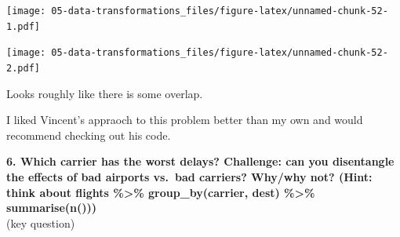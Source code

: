 \documentclass[]{book}
\newenvironment{Shaded}{\begin{snugshade}}{\end{snugshade}}
\newcommand{\DataTypeTok}[1]{\textcolor[rgb]{0.13,0.29,0.53}{#1}}
\newcommand{\KeywordTok}[1]{\textcolor[rgb]{0.13,0.29,0.53}{\textbf{#1}}}
\newcommand{\NormalTok}[1]{#1}
\newcommand{\OperatorTok}[1]{\textcolor[rgb]{0.81,0.36,0.00}{\textbf{#1}}}
\newcommand{\OtherTok}[1]{\textcolor[rgb]{0.56,0.35,0.01}{#1}}
\newcommand{\StringTok}[1]{\textcolor[rgb]{0.31,0.60,0.02}{#1}}
\theoremstyle{definition}
\theoremstyle{definition}
\theoremstyle{definition}
\theoremstyle{remark}
\begin{document}
\texttt{[image: 05-data-transformations\_files/figure-latex/unnamed-chunk-52-1.pdf]}

\begin{Shaded}
\end{Shaded}

\texttt{[image: 05-data-transformations\_files/figure-latex/unnamed-chunk-52-2.pdf]}

Looks roughly like there is some overlap.

I liked Vincent's appraoch to this problem better than my own and would
recommend checking out his code.

\textbf{6. Which carrier has the worst delays? Challenge: can you
disentangle the effects of bad airports vs.~bad carriers? Why/why not?
(Hint: think about flights \%\textgreater{}\% group\_by(carrier, dest)
\%\textgreater{}\% summarise(n()))}\\
(key question)

\begin{Shaded}
\end{Shaded}
\end{document}
